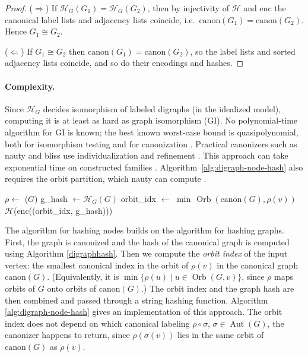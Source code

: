 \documentclass[twoside,leqno]{article}
\DeclareMathOperator{\Aut}{Aut}
\DeclareMathOperator{\Orb}{Orb}
\newcommand{\HG}{\mathcal{H}_{G}}
\newcommand{\HN}{\mathcal{H}_{N}}
\newcommand{\enc}{\mathrm{enc}}
\newcommand{\canon}{\mathrm{canon}}
\newcommand{\iso}{\cong}
\begin{document}
\begin{proof}
($\Rightarrow$) If $\HG(G_1)=\HG(G_2)$, then by injectivity of $\mathcal{H}$ and $\enc$ the canonical label lists and adjacency lists coincide, i.e.\ $\canon(G_1)=\canon(G_2)$. Hence $G_1 \iso G_2$.

($\Leftarrow$) If $G_1 \iso G_2$ then $\canon(G_1)=\canon(G_2)$, so the label lists and sorted adjacency lists coincide, and so do their encodings and hashes.
\end{proof}

\paragraph{Complexity.} Since $\HG$ decides isomorphism of labeled digraphs (in the idealized model), computing it is at least as hard as graph isomorphism (GI). No polynomial-time algorithm for GI is known; the best known worst-case bound is quasipolynomial, both for isomorphism testing \cite{babai2016quasipolynomial} and for canonization \cite{babai2019canonical}. Practical canonizers such as nauty and bliss use individualization and refinement \cite{mckay2014practical,bliss}. This approach can take exponential time on constructed families \cite{neuen2018exponential}. Algorithm~\ref{alg:digraph-node-hash} also requires the orbit partition, which nauty can compute \cite{nautyuserguide}.

\begin{algorithm}[t]
    \caption{Global Digraph Node Hash}\label{alg:digraph-node-hash}
    \begin{algorithmic}[1]
    \Function{$\HN$}{$G$, $v$}
        \State $\rho \gets$ ($G$) 
        \State g\_hash $\gets \HG(G)$ 
        \State orbit\_idx $\gets$ $\min\,\Orb(\canon(G), \rho(v))$
        \State \Return $\mathcal{H}$($\enc$((orbit\_idx, g\_hash)))
    \EndFunction
    \end{algorithmic}
\end{algorithm}

The algorithm for hashing nodes builds on the algorithm for hashing graphs. First, the graph is canonized and the hash of the canonical graph is computed using Algorithm \ref{digraphhash}. Then we compute the \emph{orbit index} of the input vertex: the smallest canonical index in the orbit of $\rho(v)$ in the canonical graph $\canon(G)$. (Equivalently, it is $\min\{\rho(u) \mid u \in \Orb(G,v)\}$, since $\rho$ maps orbits of $G$ onto orbits of $\canon(G)$.) The orbit index and the graph hash are then combined and passed through a string hashing function. Algorithm \ref{alg:digraph-node-hash} gives an implementation of this approach. The orbit index does not depend on which canonical labeling $\rho\circ\sigma$, $\sigma\in\Aut(G)$, the canonizer happens to return, since $\rho(\sigma(v))$ lies in the same orbit of $\canon(G)$ as $\rho(v)$.
\end{document}
